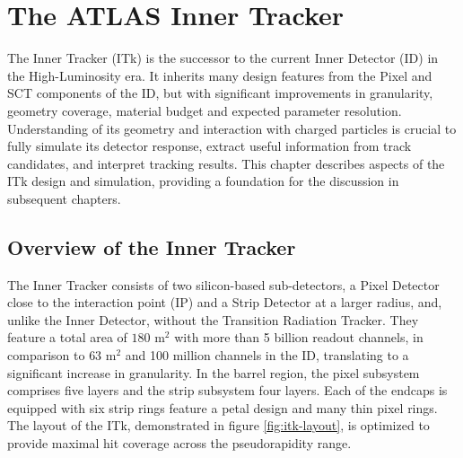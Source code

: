 
\chapter{The ATLAS Inner Tracker}
\label{chap:itk}
The Inner Tracker (ITk) is the successor to the current Inner Detector (ID) in the High-Luminosity era.
It inherits many design features from the Pixel and SCT components of the ID, but with significant improvements in granularity, geometry coverage, material budget and expected parameter resolution. 
Understanding of its geometry and interaction with charged particles is crucial to fully simulate its detector response, extract useful information from track candidates, and interpret tracking results.
This chapter describes aspects of the ITk design and simulation, providing a foundation for the discussion in subsequent chapters. 

\section{Overview of the Inner Tracker}
\label{sect:itk-overview}

The Inner Tracker consists of two silicon-based sub-detectors, a Pixel Detector close to the interaction point (IP) and a Strip Detector at a larger radius, and, unlike the Inner Detector, without the Transition Radiation Tracker. 
They feature a total area of $180$ $\mathrm{m}^2$ with more than 5 billion readout channels, in comparison to $63$ $\mathrm{m}^2$ and 100 million channels in the ID, translating to a significant increase in granularity. 
In the barrel region, the pixel subsystem comprises five layers and the strip subsystem four layers.
Each of the endcaps is equipped with six strip rings feature a petal design and many thin pixel rings. 
The layout of the ITk, demonstrated in figure \ref{fig:itk-layout}, is optimized to provide maximal hit coverage across the pseudorapidity range. 

